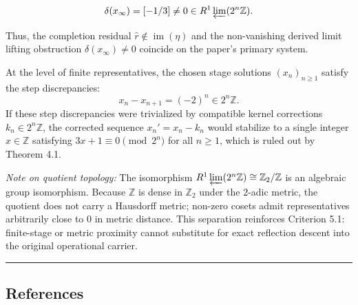 \documentclass[
  11pt,
]{article}
\theoremstyle{plain}
\theoremstyle{definition}\newtheorem{definition}[theorem]{Definition}
\theoremstyle{remark}\newtheorem*{remark}{Remark}
\begin{document}
\[
\delta(x_\infty) = [-1/3] \neq 0 \in R^1 \varprojlim (2^n \mathbb{Z}).
\]

Thus, the completion residual \(\hat{r} \notin \operatorname{im}(\eta)\)
and the non-vanishing derived limit lifting obstruction
\(\delta(x_\infty) \neq 0\) coincide on the paper's primary system.

At the level of finite representatives, the chosen stage solutions
\((x_n)_{n \ge 1}\) satisfy the step discrepancies: \[
x_n - x_{n+1} = (-2)^n \in 2^n \mathbb{Z}.
\] If these step discrepancies were trivialized by compatible kernel
corrections \(k_n \in 2^n \mathbb{Z}\), the corrected sequence
\(x_n' = x_n - k_n\) would stabilize to a single integer
\(x \in \mathbb{Z}\) satisfying \(3x + 1 \equiv 0 \pmod{2^n}\) for all
\(n \ge 1\), which is ruled out by Theorem 4.1.

\emph{Note on quotient topology:} The isomorphism
\(R^1 \varprojlim (2^n \mathbb{Z}) \cong \mathbb{Z}_2 / \mathbb{Z}\) is
an algebraic group isomorphism. Because \(\mathbb{Z}\) is dense in
\(\mathbb{Z}_2\) under the \(2\)-adic metric, the quotient does not
carry a Hausdorff metric; non-zero cosets admit representatives
arbitrarily close to \(0\) in metric distance. This separation
reinforces Criterion 5.1: finite-stage or metric proximity cannot
substitute for exact reflection descent into the original operational
carrier.

\begin{center}\rule{0.5\linewidth}{0.5pt}\end{center}

\subsection{References}\label{references}
\end{document}
